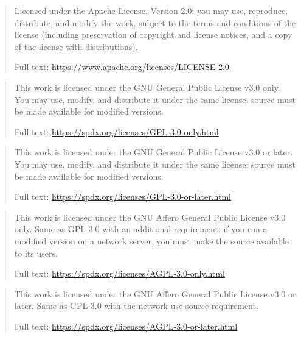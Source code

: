 \expandafter\def\csname qthesis@licensetext@Apache-2.0\endcsname{%
  \begin{quote}\small\raggedright
    Licensed under the Apache License, Version 2.0: you may use, reproduce, distribute, and modify the work, subject to the terms and conditions of the license (including preservation of copyright and license notices, and a copy of the license with distributions).

    Full text: \url{https://www.apache.org/licenses/LICENSE-2.0}
  \end{quote}%
}
\expandafter\def\csname qthesis@licensetext@GPL-3.0-only\endcsname{%
  \begin{quote}\small\raggedright
    This work is licensed under the GNU General Public License v3.0 only. You may use, modify, and distribute it under the same license; source must be made available for modified versions.

    Full text: \url{https://spdx.org/licenses/GPL-3.0-only.html}
  \end{quote}%
}
\expandafter\def\csname qthesis@licensetext@GPL-3.0-or-later\endcsname{%
  \begin{quote}\small\raggedright
    This work is licensed under the GNU General Public License v3.0 or later. You may use, modify, and distribute it under the same license; source must be made available for modified versions.

    Full text: \url{https://spdx.org/licenses/GPL-3.0-or-later.html}
  \end{quote}%
}
\expandafter\def\csname qthesis@licensetext@AGPL-3.0-only\endcsname{%
  \begin{quote}\small\raggedright
    This work is licensed under the GNU Affero General Public License v3.0 only. Same as GPL-3.0 with an additional requirement: if you run a modified version on a network server, you must make the source available to its users.

    Full text: \url{https://spdx.org/licenses/AGPL-3.0-only.html}
  \end{quote}%
}
\expandafter\def\csname qthesis@licensetext@AGPL-3.0-or-later\endcsname{%
  \begin{quote}\small\raggedright
    This work is licensed under the GNU Affero General Public License v3.0 or later. Same as GPL-3.0 with the network-use source requirement.

    Full text: \url{https://spdx.org/licenses/AGPL-3.0-or-later.html}
  \end{quote}%
}
